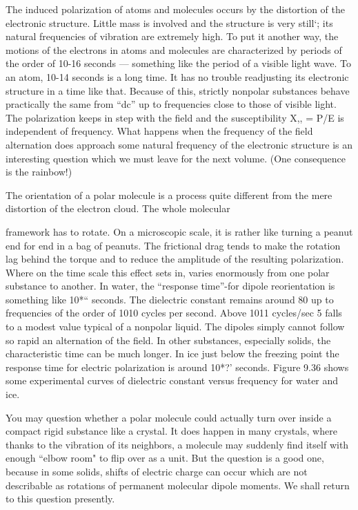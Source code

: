 The induced polarization of atoms and molecules occurs by the
distortion of the electronic structure. Little mass is involved and
the structure is very still‘; its natural frequencies of vibration are extremely
high. To put it another way, the motions of the electrons
in atoms and molecules are characterized by periods of the order
of 10-16 seconds --- something like the period of a visible light wave.
To an atom, 10-14 seconds is a long time. It has no trouble readjusting
its electronic structure in a time like that. Because of this,
strictly nonpolar substances behave practically the same from ``dc''
up to frequencies close to those of visible light. The polarization
keeps in step with the field and the susceptibility X,, = P/E is independent
of frequency. What happens when the frequency of the
field alternation does approach some natural frequency of the electronic
structure is an interesting question which we must leave for
the next volume. (One consequence is the rainbow!)

The orientation of a polar molecule is a process quite different
from the mere distortion of the electron cloud. The whole molecular

framework has to rotate. On a microscopic scale, it is rather like
turning a peanut end for end in a bag of peanuts. The frictional
drag tends to make the rotation lag behind the torque and to reduce
the amplitude of the resulting polarization. Where on the time scale
this effect sets in, varies enormously from one polar substance to
another. In water, the ``response time''-for dipole reorientation is
something like 10*`` seconds. The dielectric constant remains
around 80 up to frequencies of the order of 1010 cycles per second.
Above 1011 cycles/sec 5 falls to a modest value typical of a nonpolar
liquid. The dipoles simply cannot follow so rapid an alternation of
the field. In other substances, especially solids, the characteristic
time can be much longer. In ice just below the freezing point the
response time for electric polarization is around 10*?' seconds.
Figure 9.36 shows some experimental curves of dielectric constant
versus frequency for water and ice.

You may question whether a polar molecule could actually turn
over inside a compact rigid substance like a crystal. It does happen
in many crystals, where thanks to the vibration of its neighbors, a
molecule may suddenly find itself with enough ``elbow room" to
flip over as a unit. But the question is a good one, because in some
solids, shifts of electric charge can occur which are not describable
as rotations of permanent molecular dipole moments. We shall return
to this question presently.

